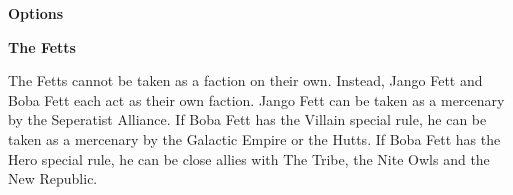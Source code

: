 \documentclass{article}
\begin{document}
\vspace{0.3cm}
{\scriptsize
\setlength\extrarowheight{1.5pt}

}
\vspace{0.6cm}

{\large \textbf{Options}}
\vspace{0.3cm}
\begin{multicols}{2}
    {\scriptsize

    \setlength\extrarowheight{1.5pt}
    

    \vspace{0.6cm}
    
    \setlength\extrarowheight{1.5pt}
    

    \vspace{0.6cm}

    \setlength\extrarowheight{1.5pt}
    

    \vspace{0.6cm}

    \setlength\extrarowheight{1.5pt}
    
    
    }
\end{multicols}

\newpage

{\Large \textbf{The Fetts}}
\vspace{0.3cm}

\begin{minipage}{19cm}
    The Fetts cannot be taken as a faction on their own. Instead, Jango Fett and
    Boba Fett each act as their own faction.
    Jango Fett can be taken as a mercenary by the Seperatist Alliance.
    If Boba Fett has the Villain special rule, he can be taken as a mercenary by the 
    Galactic Empire or the Hutts.
    If Boba Fett has the Hero special rule, he can be close allies with The Tribe,
    the Nite Owls and the New Republic.
\end{minipage}

\vspace{0.3cm}
{\scriptsize
\setlength\extrarowheight{1.5pt}

}
\vspace{0.6cm}
\end{document}
